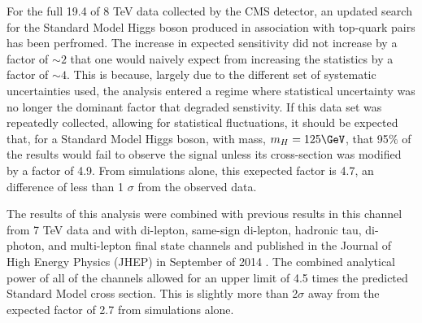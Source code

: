 \par  For the full 19.4 \fbinv of 8 TeV data collected by the CMS
detector, an updated search for the Standard Model Higgs boson produced in
association with top-quark pairs has been perfromed.  The increase in
expected sensitivity did not increase by a factor of $\sim2$ that one
would naively expect from increasing the statistics by a factor of
$\sim4$.  This is because, largely due to the different set of
systematic uncertainties used, the analysis entered a regime where
statistical uncertainty was no longer the dominant factor that
degraded senstivity.  If this data set was repeatedly
collected, allowing for statistical fluctuations, it should be
expected that, for a Standard Model Higgs boson, with mass, $m_{H} =
125 \GeV$, that 95$\%$ of the results would fail to observe the \ttH
signal unless its cross-section was modified by a factor of 4.9.  From
simulations alone, this exepected factor is 4.7, an difference of less
than 1 $\sigma$ from the observed data.    

\par The results of this analysis were combined with previous results
in this channel from 7 TeV data and with di-lepton, same-sign
di-lepton, hadronic tau, di-photon, and multi-lepton final state
channels and published in the Journal of High Energy Physics (JHEP) in
September of 2014 \cite{Khachatryan:2014qaa}.  The combined analytical power
of all of the channels allowed for an upper limit of 4.5 times
the predicted Standard Model cross section.  This is slightly more than
2$\sigma$ away from the expected factor of 2.7 from simulations
alone.  